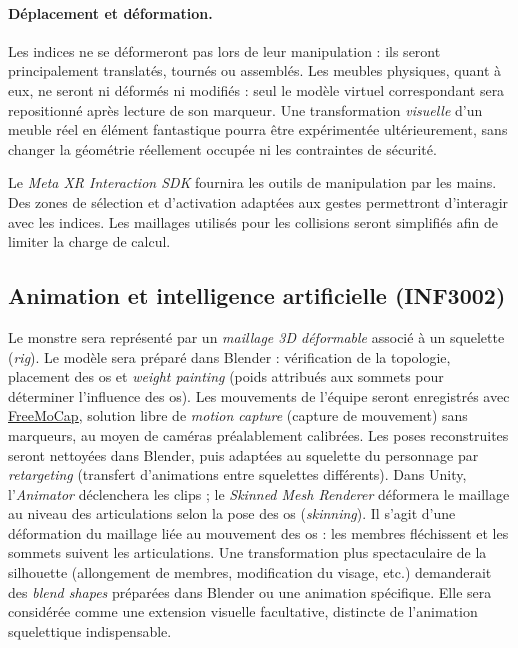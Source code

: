 \documentclass[11pt,a4paper]{article}
\newcommand{\doclink}[2]{\href{#1}{\textcolor{linkBlue}{\underline{#2}}}}
\begin{document}
\paragraph{Déplacement et déformation.} Les indices ne se déformeront pas lors de leur manipulation : ils seront principalement translatés, tournés ou assemblés. Les meubles physiques, quant à eux, ne seront ni déformés ni modifiés : seul le modèle virtuel correspondant sera repositionné après lecture de son marqueur. Une transformation \emph{visuelle} d'un meuble réel en élément fantastique pourra être expérimentée ultérieurement, sans changer la géométrie réellement occupée ni les contraintes de sécurité.

Le \emph{Meta XR Interaction SDK} fournira les outils de manipulation par les mains. Des zones de sélection et d'activation adaptées aux gestes permettront d'interagir avec les indices. Les maillages utilisés pour les collisions seront simplifiés afin de limiter la charge de calcul.

\subsection{Animation et intelligence artificielle (INF3002)}

Le monstre sera représenté par un \emph{maillage 3D déformable} associé à un squelette (\emph{rig}). Le modèle sera préparé dans Blender : vérification de la topologie, placement des os et \emph{weight painting} (poids attribués aux sommets pour déterminer l'influence des os). Les mouvements de l'équipe seront enregistrés avec \doclink{https://github.com/freemocap/freemocap}{FreeMoCap}, solution libre de \emph{motion capture} (capture de mouvement) sans marqueurs, au moyen de caméras préalablement calibrées. Les poses reconstruites seront nettoyées dans Blender, puis adaptées au squelette du personnage par \emph{retargeting} (transfert d'animations entre squelettes différents). Dans Unity, l'\emph{Animator} déclenchera les clips ; le \emph{Skinned Mesh Renderer} déformera le maillage au niveau des articulations selon la pose des os (\emph{skinning}). Il s'agit d'une déformation du maillage liée au mouvement des os : les membres fléchissent et les sommets suivent les articulations. Une transformation plus spectaculaire de la silhouette (allongement de membres, modification du visage, etc.) demanderait des \emph{blend shapes} préparées dans Blender ou une animation spécifique. Elle sera considérée comme une extension visuelle facultative, distincte de l'animation squelettique indispensable.
\end{document}
